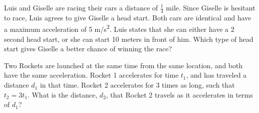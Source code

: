\documentclass[11pt]{examdesign}
\begin{document}
\begin{multiplechoice} [title={Multiple Choice},
	rearrange=no]
\begin{question}
	
\end{question}


\begin{question}
Luis and Giselle are racing their cars a distance of $\frac{1}{4}$ mile.  Since Giselle is hesitant to race, Luis agrees to give Giselle a head start.  Both cars are identical and have a maximum acceleration of 5 m/s\textsuperscript{2}.  Luis states that she can either have a 2 second head start, or she can start 10 meters in front of him.  Which type of head start gives Giselle a better chance of winning the race?
	
\end{question}


\begin{question}
Two Rockets are launched at the same time from the same location, and both have the same acceleration.  Rocket 1 accelerates for time $t_1$, and has traveled a distance $d_1$ in that time. Rocket 2 accelerates for 3 times as long, such that $t_2 = 3 t_1$.   What is the distance, $d_2$, that Rocket 2 travels as it accelerates in terms of $d_1$?


\end{question}


\end{multiplechoice}
\end{document}
